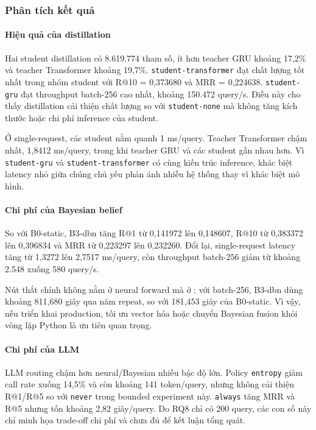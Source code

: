 \subsubsection*{Phân tích kết quả}

\paragraph{Hiệu quả của distillation}

Hai student distillation có 8.619.774 tham số, ít hơn teacher GRU khoảng 17,2\% và teacher Transformer khoảng 19,7\%. \texttt{student-transformer} đạt chất lượng tốt nhất trong nhóm student với R@10 = 0,373680 và MRR = 0,224638. \texttt{student-gru} đạt throughput batch-256 cao nhất, khoảng 150.472 query/s. Điều này cho thấy distillation cải thiện chất lượng so với \texttt{student-none} mà không tăng kích thước hoặc chi phí inference của student.

Ở single-request, các student nằm quanh 1 ms/query. Teacher Transformer chậm nhất, 1,8412 ms/query, trong khi teacher GRU và các student gần nhau hơn. Vì \texttt{student-gru} và \texttt{student-transformer} có cùng kiến trúc inference, khác biệt latency nhỏ giữa chúng chủ yếu phản ánh nhiễu hệ thống thay vì khác biệt mô hình.

\paragraph{Chi phí của Bayesian belief}

So với B0-static, B3-dbn tăng R@1 từ 0,141972 lên 0,148607, R@10 từ 0,383372 lên 0,396834 và MRR từ 0,223297 lên 0,232260. Đổi lại, single-request latency tăng từ 1,3272 lên 2,7517 ms/query, còn throughput batch-256 giảm từ khoảng 2.548 xuống 580 query/s.

Nút thắt chính không nằm ở neural forward mà ở : với batch-256, B3-dbn dùng khoảng 811,680 giây qua năm repeat, so với 181,453 giây của B0-static. Vì vậy, nếu triển khai production, tối ưu vector hóa hoặc chuyển Bayesian fusion khỏi vòng lặp Python là ưu tiên quan trọng.

\paragraph{Chi phí của LLM}

LLM routing chậm hơn neural/Bayesian nhiều bậc độ lớn. Policy \texttt{entropy} giảm call rate xuống 14,5\% và còn khoảng 141 token/query, nhưng không cải thiện R@1/R@5 so với \texttt{never} trong bounded experiment này. \texttt{always} tăng MRR và R@5 nhưng tốn khoảng 2,82 giây/query. Do RQ8 chỉ có 200 query, các con số này chỉ minh họa trade-off chi phí và chưa đủ để kết luận tổng quát.

